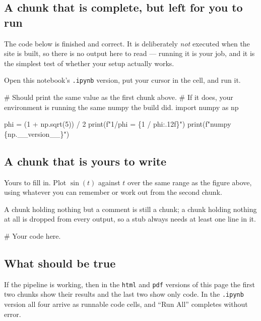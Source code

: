 \documentclass[
  letterpaper,
  DIV=11,
  numbers=noendperiod]{scrartcl}
\newenvironment{Shaded}{\begin{snugshade}}{\end{snugshade}}
\newcommand{\BuiltInTok}[1]{\textcolor[rgb]{0.00,0.23,0.31}{#1}}
\newcommand{\CommentTok}[1]{\textcolor[rgb]{0.37,0.37,0.37}{#1}}
\newcommand{\DecValTok}[1]{\textcolor[rgb]{0.68,0.00,0.00}{#1}}
\newcommand{\ImportTok}[1]{\textcolor[rgb]{0.00,0.46,0.62}{#1}}
\newcommand{\NormalTok}[1]{\textcolor[rgb]{0.00,0.23,0.31}{#1}}
\newcommand{\OperatorTok}[1]{\textcolor[rgb]{0.37,0.37,0.37}{#1}}
\newcommand{\SpecialCharTok}[1]{\textcolor[rgb]{0.37,0.37,0.37}{#1}}
\newcommand{\SpecialStringTok}[1]{\textcolor[rgb]{0.13,0.47,0.30}{#1}}
\begin{document}
\subsection{A chunk that is complete, but left for you to run}\label{a-chunk-that-is-complete-but-left-for-you-to-run}

The code below is finished and correct.
It is deliberately \emph{not} executed when the site is built, so there is no output here to read --- running it is your job, and it is the simplest test of whether your setup actually works.

Open this notebook's \texttt{.ipynb} version, put your cursor in the cell, and run it.

\begin{Shaded}
\begin{Highlighting}[]
\CommentTok{\# Should print the same value as the first chunk above.}
\CommentTok{\# If it does, your environment is running the same numpy the build did.}
\ImportTok{import}\NormalTok{ numpy }\ImportTok{as}\NormalTok{ np}

\NormalTok{phi }\OperatorTok{=}\NormalTok{ (}\DecValTok{1} \OperatorTok{+}\NormalTok{ np.sqrt(}\DecValTok{5}\NormalTok{)) }\OperatorTok{/} \DecValTok{2}
\BuiltInTok{print}\NormalTok{(}\SpecialStringTok{f"1/phi = }\SpecialCharTok{\{}\DecValTok{1} \OperatorTok{/}\NormalTok{ phi}\SpecialCharTok{:.12f\}}\SpecialStringTok{"}\NormalTok{)}
\BuiltInTok{print}\NormalTok{(}\SpecialStringTok{f"numpy }\SpecialCharTok{\{}\NormalTok{np}\SpecialCharTok{.}\NormalTok{\_\_version\_\_}\SpecialCharTok{\}}\SpecialStringTok{"}\NormalTok{)}
\end{Highlighting}
\end{Shaded}

\subsection{A chunk that is yours to write}\label{a-chunk-that-is-yours-to-write}

Yours to fill in.
Plot \(\sin(t)\) against \(t\) over the same range as the figure above, using whatever you can remember or work out from the second chunk.

A chunk holding nothing but a comment is still a chunk; a chunk holding nothing at all is dropped from every output, so a stub always needs at least one line in it.

\begin{Shaded}
\begin{Highlighting}[]
\CommentTok{\# Your code here.}
\end{Highlighting}
\end{Shaded}

\subsection{What should be true}\label{what-should-be-true}

If the pipeline is working, then in the \texttt{html} and \texttt{pdf} versions of this page the first two chunks show their results and the last two show only code.
In the \texttt{.ipynb} version all four arrive as runnable code cells, and ``Run All'' completes without error.
\end{document}
